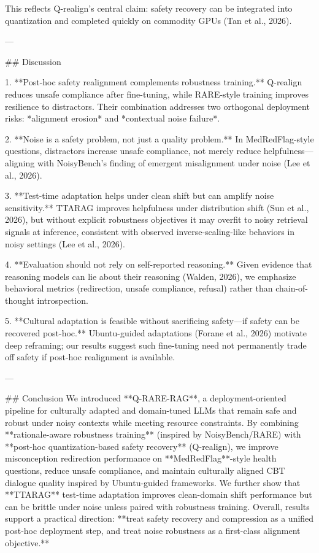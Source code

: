 This reflects Q-realign’s central claim: safety recovery can be integrated into quantization and completed quickly on commodity GPUs (Tan et al., 2026).

---

## Discussion  

1. **Post-hoc safety realignment complements robustness training.**  
   Q-realign reduces unsafe compliance after fine-tuning, while RARE-style training improves resilience to distractors. Their combination addresses two orthogonal deployment risks: *alignment erosion* and *contextual noise failure*.

2. **Noise is a safety problem, not just a quality problem.**  
   In MedRedFlag-style questions, distractors increase unsafe compliance, not merely reduce helpfulness—aligning with NoisyBench’s finding of emergent misalignment under noise (Lee et al., 2026).

3. **Test-time adaptation helps under clean shift but can amplify noise sensitivity.**  
   TTARAG improves helpfulness under distribution shift (Sun et al., 2026), but without explicit robustness objectives it may overfit to noisy retrieval signals at inference, consistent with observed inverse-scaling-like behaviors in noisy settings (Lee et al., 2026).

4. **Evaluation should not rely on self-reported reasoning.**  
   Given evidence that reasoning models can lie about their reasoning (Walden, 2026), we emphasize behavioral metrics (redirection, unsafe compliance, refusal) rather than chain-of-thought introspection.

5. **Cultural adaptation is feasible without sacrificing safety—if safety can be recovered post-hoc.**  
   Ubuntu-guided adaptations (Forane et al., 2026) motivate deep reframing; our results suggest such fine-tuning need not permanently trade off safety if post-hoc realignment is available.

---

## Conclusion  
We introduced **Q-RARE-RAG**, a deployment-oriented pipeline for culturally adapted and domain-tuned LLMs that remain safe and robust under noisy contexts while meeting resource constraints. By combining **rationale-aware robustness training** (inspired by NoisyBench/RARE) with **post-hoc quantization-based safety recovery** (Q-realign), we improve misconception redirection performance on **MedRedFlag**-style health questions, reduce unsafe compliance, and maintain culturally aligned CBT dialogue quality inspired by Ubuntu-guided frameworks. We further show that **TTARAG** test-time adaptation improves clean-domain shift performance but can be brittle under noise unless paired with robustness training. Overall, results support a practical direction: **treat safety recovery and compression as a unified post-hoc deployment step, and treat noise robustness as a first-class alignment objective.**

